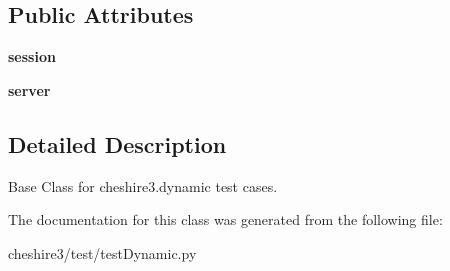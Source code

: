\subsection*{Public Attributes}
\begin{DoxyCompactItemize}
\item 
\hypertarget{classcheshire3_1_1test_1_1test_dynamic_1_1_dynamic_test_case_ac3a12780798bdc4540ce993ccc1146ea}{{\bfseries session}}\label{classcheshire3_1_1test_1_1test_dynamic_1_1_dynamic_test_case_ac3a12780798bdc4540ce993ccc1146ea}

\item 
\hypertarget{classcheshire3_1_1test_1_1test_dynamic_1_1_dynamic_test_case_ade94f24a48010f4d576cd028b91e14d4}{{\bfseries server}}\label{classcheshire3_1_1test_1_1test_dynamic_1_1_dynamic_test_case_ade94f24a48010f4d576cd028b91e14d4}

\end{DoxyCompactItemize}


\subsection{Detailed Description}
\begin{DoxyVerb}Base Class for cheshire3.dynamic test cases.\end{DoxyVerb}
 

The documentation for this class was generated from the following file\-:\begin{DoxyCompactItemize}
\item 
cheshire3/test/test\-Dynamic.\-py\end{DoxyCompactItemize}
